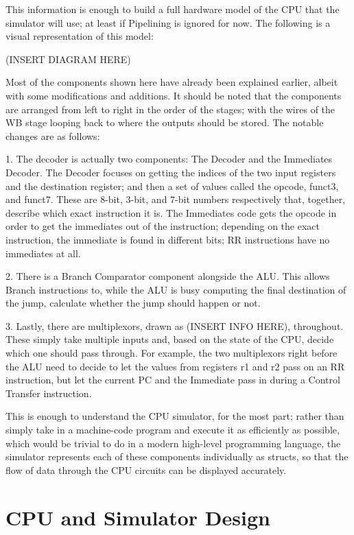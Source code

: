 \documentclass[12pt,twoside]{reedthesis}
\begin{document}
This information is enough to build a full hardware model of the CPU that the simulator will use; at least if Pipelining is ignored for now. The following is a visual representation of this model:

(INSERT DIAGRAM HERE)

Most of the components shown here have already been explained earlier, albeit with some modifications and additions. It should be noted that the components are arranged from left to right in the order of the stages; with the wires of the WB stage looping back to where the outputs should be stored. The notable changes are as follows:

1. The decoder is actually two components: The Decoder and the Immediates Decoder. The Decoder focuses on getting the indices of the two input registers and the destination register; and then a set of values called the opcode, funct3, and funct7. These are 8-bit, 3-bit, and 7-bit numbers respectively that, together, describe which exact instruction it is. The Immediates code gets the opcode in order to get the immediates out of the instruction; depending on the exact instruction, the immediate is found in different bits; RR instructions have no immediates at all.

2. There is a Branch Comparator component alongside the ALU. This allows Branch instructions to, while the ALU is busy computing the final destination of the jump, calculate whether the jump should happen or not.

3. Lastly, there are multiplexors, drawn as (INSERT INFO HERE), throughout. These simply take multiple inputs and, based on the state of the CPU, decide which one should pass through. For example, the two multiplexors right before the ALU need to decide to let the values from registers r1 and r2 pass on an RR instruction, but let the current PC and the Immediate pass in during a Control Transfer instruction.

This is enough to understand the CPU simulator, for the most part; rather than simply take in a machine-code program and execute it as efficiently as possible, which would be trivial to do in a modern high-level programming language, the simulator represents each of these components individually as structs, so that the flow of data through the CPU circuits can be displayed accurately.

\chapter{CPU and Simulator Design}
\end{document}
